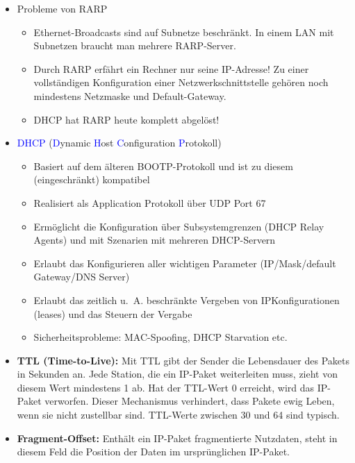\begin{itemize}
    \item Probleme von RARP
    \begin{itemize}
        \item Ethernet-Broadcasts sind auf Subnetze beschränkt.
        In einem LAN mit Subnetzen braucht man mehrere RARP-Server.
        \item Durch RARP erfährt ein Rechner nur seine IP-Adresse!
        Zu einer vollständigen Konfiguration einer Netzwerkschnittstelle gehören noch mindestens Netzmaske und Default-Gateway.
        \item DHCP hat RARP heute komplett abgelöst!
    \end{itemize}
    \item \textcolor{blue}{DHCP} (\textcolor{blue}{D}ynamic \textcolor{blue}{H}ost \textcolor{blue}{C}onfiguration \textcolor{blue}{P}rotokoll)
    \begin{itemize}
        \item Basiert auf dem älteren BOOTP-Protokoll und ist zu diesem (eingeschränkt) kompatibel
        \item Realisiert als Application Protokoll über UDP Port 67
        \item Ermöglicht die Konfiguration über Subsystemgrenzen (DHCP Relay Agents) und mit Szenarien mit mehreren DHCP-Servern
        \item Erlaubt das Konfigurieren aller wichtigen Parameter (IP/Mask/default Gateway/DNS Server)
        \item Erlaubt das zeitlich u.\ A. beschränkte Vergeben von IPKonfigurationen (leases) und das Steuern der Vergabe
        \item Sicherheitsprobleme: MAC-Spoofing, DHCP Starvation etc.
    \end{itemize}
\end{itemize}

\begin{itemize}
    \item \textbf{TTL (Time-to-Live): } Mit TTL gibt der Sender die Lebensdauer des Pakets in Sekunden an.
    Jede Station, die ein IP-Paket weiterleiten muss, zieht von diesem Wert mindestens 1 ab.
    Hat der TTL-Wert 0 erreicht, wird das IP-Paket verworfen.
    Dieser Mechanismus verhindert, dass Pakete ewig Leben, wenn sie nicht zustellbar sind.
    TTL-Werte zwischen 30 und 64 sind typisch.
    \item \textbf{Fragment-Offset:} Enthält ein IP-Paket fragmentierte Nutzdaten, steht in diesem Feld die Position der Daten im ursprünglichen IP-Paket.
\end{itemize}

